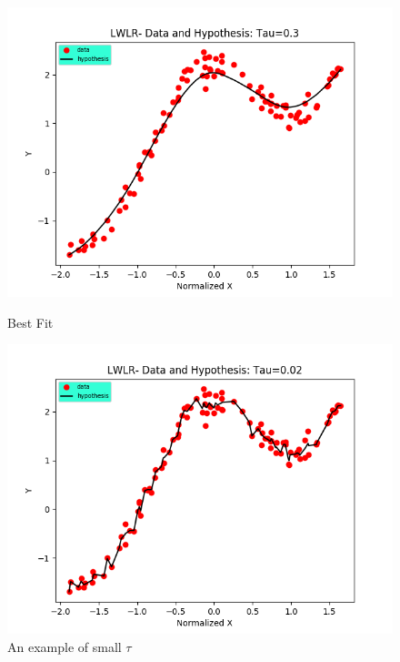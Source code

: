 \documentclass{article}
\begin{document}
\begin{figure}
\vspace*{-2cm}
\centering
\includegraphics[scale=0.9]{LWLR_good.png}
\caption{Best Fit}
\includegraphics[scale=0.9]{LWLR_over.png}
\caption{An example of small $\tau$}
\end{figure}
\end{document}
